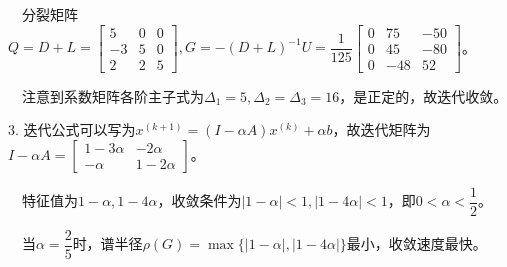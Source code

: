 \documentclass[cn,hazy,green,11pt,normal]{elegantnote}
\begin{document}
    $\quad$分裂矩阵$Q=D+L=\begin{bmatrix}5&0&0\\-3&5&0\\2&2&5\end{bmatrix},G=-(D+L)^{-1}U=\dfrac1{125}\begin{bmatrix}0&75&-50\\0&45&-80\\ 0&-48&52\end{bmatrix}$。

    $\quad$注意到系数矩阵各阶主子式为$\Delta_1=5,\Delta_2=\Delta_3=16$，是正定的，故迭代收敛。

    $3.\,\,$迭代公式可以写为$x^{(k+1)}=(I-\alpha A)x^{(k)}+\alpha b$，故迭代矩阵为$I-\alpha A=\begin{bmatrix}1-3\alpha&-2\alpha\\-\alpha &1-2\alpha\end{bmatrix}$。

    $\quad$特征值为$1-\alpha,1-4\alpha$，收敛条件为$|1-\alpha|<1,|1-4\alpha|<1$，即$0<\alpha<\dfrac12$。

    $\quad$当$\alpha=\dfrac25$时，谱半径$\rho(G)=\max\{|1-\alpha|,|1-4\alpha|\}$最小，收敛速度最快。
\end{document}
